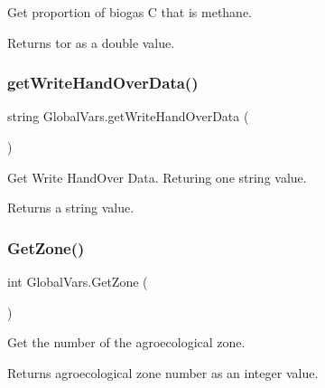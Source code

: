 Get proportion of biogas C that is methane. 

\begin{DoxyReturn}{Returns}
tor as a double value. 
\end{DoxyReturn}
\mbox{\label{class_global_vars_aba6cb8dacca6e4db1f77c504027e38a7}} 
\subsubsection{\texorpdfstring{getWriteHandOverData()}{getWriteHandOverData()}}
{\footnotesize\ttfamily string Global\+Vars.\+get\+Write\+Hand\+Over\+Data (\begin{DoxyParamCaption}{ }\end{DoxyParamCaption})\hspace{0.3cm}{\ttfamily [inline]}}



Get Write Hand\+Over Data. Returing one string value. 

\begin{DoxyReturn}{Returns}
a string value. 
\end{DoxyReturn}
\mbox{\label{class_global_vars_a093efdf94804ab6ddbf94a475543ea15}} 
\subsubsection{\texorpdfstring{GetZone()}{GetZone()}}
{\footnotesize\ttfamily int Global\+Vars.\+Get\+Zone (\begin{DoxyParamCaption}{ }\end{DoxyParamCaption})\hspace{0.3cm}{\ttfamily [inline]}}



Get the number of the agroecological zone. 

\begin{DoxyReturn}{Returns}
agroecological zone number as an integer value. 
\end{DoxyReturn}
\mbox{\label{class_global_vars_a4b8a43181c226aed4b3334209f337ae2}} 
